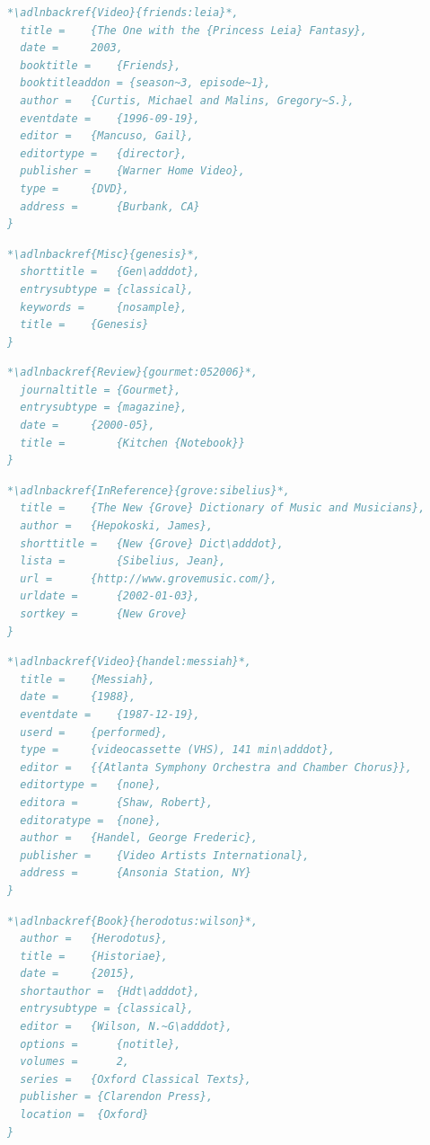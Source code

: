 \documentclass[a4paper,12pt]{article}
\begin{document}
\begin{lstlisting}[language=BibTeX,label=friends:leia]
*\adlnbackref{Video}{friends:leia}*,
  title = 	 {The One with the {Princess Leia} Fantasy},
  date = 	 2003,
  booktitle = 	 {Friends},
  booktitleaddon = {season~3, episode~1},
  author = 	 {Curtis, Michael and Malins, Gregory~S.},
  eventdate = 	 {1996-09-19},
  editor = 	 {Mancuso, Gail},
  editortype = 	 {director},
  publisher =    {Warner Home Video},
  type = 	 {DVD},
  address = 	 {Burbank, CA}
}
\end{lstlisting}
\begin{lstlisting}[language=BibTeX,label=genesis]
*\adlnbackref{Misc}{genesis}*,
  shorttitle = 	 {Gen\adddot},
  entrysubtype = {classical},
  keywords = 	 {nosample},
  title = 	 {Genesis}
}
\end{lstlisting}
\begin{lstlisting}[language=BibTeX,label=gourmet:052006]
*\adlnbackref{Review}{gourmet:052006}*,
  journaltitle = {Gourmet},
  entrysubtype = {magazine},
  date = 	 {2000-05},
  title =        {Kitchen {Notebook}}
}
\end{lstlisting}
\begin{lstlisting}[language=BibTeX,label=grove:sibelius]
*\adlnbackref{InReference}{grove:sibelius}*,
  title = 	 {The New {Grove} Dictionary of Music and Musicians},
  author = 	 {Hepokoski, James},
  shorttitle = 	 {New {Grove} Dict\adddot},
  lista =        {Sibelius, Jean},
  url = 	 {http://www.grovemusic.com/},
  urldate = 	 {2002-01-03},
  sortkey = 	 {New Grove}
}
\end{lstlisting}
\begin{lstlisting}[language=BibTeX,label=handel:messiah]
*\adlnbackref{Video}{handel:messiah}*,
  title = 	 {Messiah},
  date = 	 {1988},
  eventdate = 	 {1987-12-19},
  userd = 	 {performed},
  type = 	 {videocassette (VHS), 141 min\adddot},
  editor = 	 {{Atlanta Symphony Orchestra and Chamber Chorus}},
  editortype = 	 {none},
  editora = 	 {Shaw, Robert},
  editoratype =  {none},
  author = 	 {Handel, George Frederic},
  publisher =    {Video Artists International},
  address = 	 {Ansonia Station, NY}
}
\end{lstlisting}
\begin{lstlisting}[language=BibTeX,label=herodotus:wilson]
*\adlnbackref{Book}{herodotus:wilson}*,
  author = 	 {Herodotus},
  title = 	 {Historiae},
  date = 	 {2015},
  shortauthor =  {Hdt\adddot},
  entrysubtype = {classical},
  editor = 	 {Wilson, N.~G\adddot},
  options = 	 {notitle},
  volumes = 	 2,
  series = 	 {Oxford Classical Texts},
  publisher = {Clarendon Press},
  location =  {Oxford}
}
\end{lstlisting}
\end{document}
